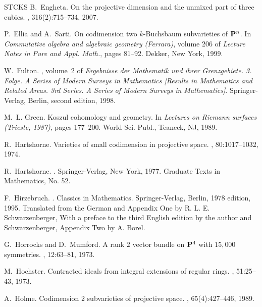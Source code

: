 \documentclass[11pt,a4paper]{amsart}
\theoremstyle{plain}
\theoremstyle{definition}
\begin{document}
\begin{thebibliography}{STCKS}
B.~Engheta.
\newblock On the projective dimension and the unmixed part of three cubics.
, 316(2):715--734, 2007.

P.~Ellia and A.~Sarti.
\newblock On codimension two {$k$}-{B}uchsbaum subvarieties of {${\bf P}^n$}.
\newblock In {\em Commutative algebra and algebraic geometry ({F}errara)},
  volume 206 of {\em Lecture Notes in Pure and Appl. Math.}, pages 81--92.
  Dekker, New York, 1999.

W.~Fulton.
, volume~2 of {\em Ergebnisse der Mathematik
  und ihrer Grenzgebiete. 3. Folge. A Series of Modern Surveys in Mathematics
  [Results in Mathematics and Related Areas. 3rd Series. A Series of Modern
  Surveys in Mathematics]}.
\newblock Springer-Verlag, Berlin, second edition, 1998.

M.~L. Green.
\newblock Koszul cohomology and geometry.
\newblock In {\em Lectures on {R}iemann surfaces ({T}rieste, 1987)}, pages
  177--200. World Sci. Publ., Teaneck, NJ, 1989.

R.~Hartshorne.
\newblock Varieties of small codimension in projective space.
, 80:1017--1032, 1974.

R.~Hartshorne.
.
\newblock Springer-Verlag, New York, 1977.
\newblock Graduate Texts in Mathematics, No. 52.

F.~Hirzebruch.
.
\newblock Classics in Mathematics. Springer-Verlag, Berlin, 1978 edition, 1995.
\newblock Translated from the German and Appendix One by R. L. E.
  Schwarzenberger, With a preface to the third English edition by the author
  and Schwarzenberger, Appendix Two by A. Borel.

G.~Horrocks and D.~Mumford.
\newblock A rank {$2$} vector bundle on {${\bf P}\sp{4}$} with {$15,000$}
  symmetries.
, 12:63--81, 1973.

M.~Hochster.
\newblock Contracted ideals from integral extensions of regular rings.
, 51:25--43, 1973.

A.~Holme.
\newblock Codimension {$2$} subvarieties of projective space.
, 65(4):427--446, 1989.


\end{thebibliography}
\end{document}
